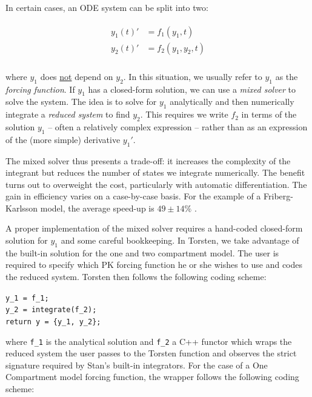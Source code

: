 \documentclass[11pt]{amsart}
\begin{document}
In certain cases, an ODE system can be split into two:

\begin{eqnarray*}
  \begin{aligned}
  y_1(t)' &= f_1(y_1, t) \\
  y_2(t)' &= f_2(y_1, y_2, t) \\
  \end{aligned}
\end{eqnarray*}

where $y_1$ does \underline{not} depend on $y_2$. In this situation, we usually refer to $y_1$
as the \textit{forcing function}. If $y_1$ has a closed-form solution, we can use a \textit{mixed solver} 
to solve the system. The idea is to solve for $y_1$ analytically and then 
numerically integrate a \textit{reduced system} to find $y_2$. This requires we write $f_2$ in 
terms of the solution $y_1$ -- often a relatively complex expression -- rather than as an 
expression of the (more simple) derivative $y_1'$. 

The mixed solver thus presents a trade-off: it increases the complexity of the integrant 
but reduces the number of states we integrate numerically. The benefit turns out to overweight 
the cost, particularly with automatic differentiation. The gain in efficiency varies on a case-by-case 
basis. For the example of a Friberg-Karlsson model, the average speed-up is $49 \pm 14 \%$
 \cite{Margossian:2017b}.

A proper implementation of the mixed solver requires a hand-coded closed-form solution for $y_1$ 
and some careful bookkeeping. In Torsten, we take advantage of the built-in solution for the one and 
two compartment model. The user is required
to specify which PK forcing function he or she wishes to use and codes the reduced system. Torsten 
then follows the following coding scheme:

\texttt{y\_1 = f\_1; \\
y\_2 = integrate(f\_2); \\
return y = \{y\_1, y\_2\}; \\
  }

where \texttt{f\_1} is the analytical solution and \texttt{f\_2} a C++ functor which wraps the reduced
system the user passes to the Torsten function and observes the strict signature required by Stan's
built-in integrators. For the case of a One Compartment model forcing function, the wrapper follows 
the following coding scheme:
\end{document}
